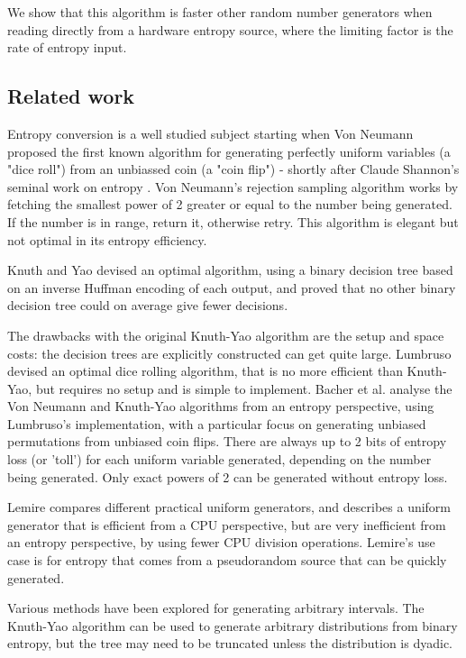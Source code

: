 \documentclass[12pt]{article}
\begin{document}
We show that this algorithm is faster other random number generators when reading directly from a hardware entropy source, where the limiting factor is the rate of entropy input.

\subsection{Related work}

Entropy conversion is a well studied subject starting when Von Neumann \cite{neumann51} proposed the first known algorithm for generating perfectly uniform variables (a "dice roll") from an unbiassed coin (a "coin flip") - shortly after Claude Shannon's seminal work on entropy \cite{shannon1948mathematical}. Von Neumann's rejection sampling algorithm works by fetching the smallest power of 2 greater or equal to the number being generated. If the number is in range, return it, otherwise retry. This algorithm is elegant but not optimal in its entropy efficiency.

Knuth and Yao \cite{Knuth1976TheCO} devised an optimal algorithm, using a binary decision tree based on an inverse Huffman encoding \cite{huffman} of each output, and proved that no other binary decision tree could on average give fewer decisions.

The drawbacks with the original Knuth-Yao algorithm are the setup and space costs: the decision trees are explicitly constructed can get quite large. \cite{saad2025} Lumbruso \cite{lumbroso2013optimal} devised an optimal dice rolling algorithm, that is no more efficient than Knuth-Yao, but requires no setup and is simple to implement. Bacher et al. \cite{bacher2017} analyse the Von Neumann and Knuth-Yao algorithms from an entropy perspective, using Lumbruso's implementation, with a particular focus on generating unbiased permutations from unbiased coin flips. There are always up to 2 bits of entropy loss (or 'toll') for each uniform variable generated, depending on the number being generated. Only exact powers of 2 can be generated without entropy loss.

Lemire \cite{lemire2019fast} compares different practical uniform generators, and describes a uniform generator that is efficient from a CPU perspective, but are very inefficient from an entropy perspective, by using fewer CPU division operations. Lemire's use case is for entropy that comes from a pseudorandom source that can be quickly generated.

Various methods have been explored for generating arbitrary intervals.
The Knuth-Yao algorithm can be used to generate arbitrary distributions from binary entropy, but the tree may need to be truncated unless the distribution is dyadic.
\end{document}
